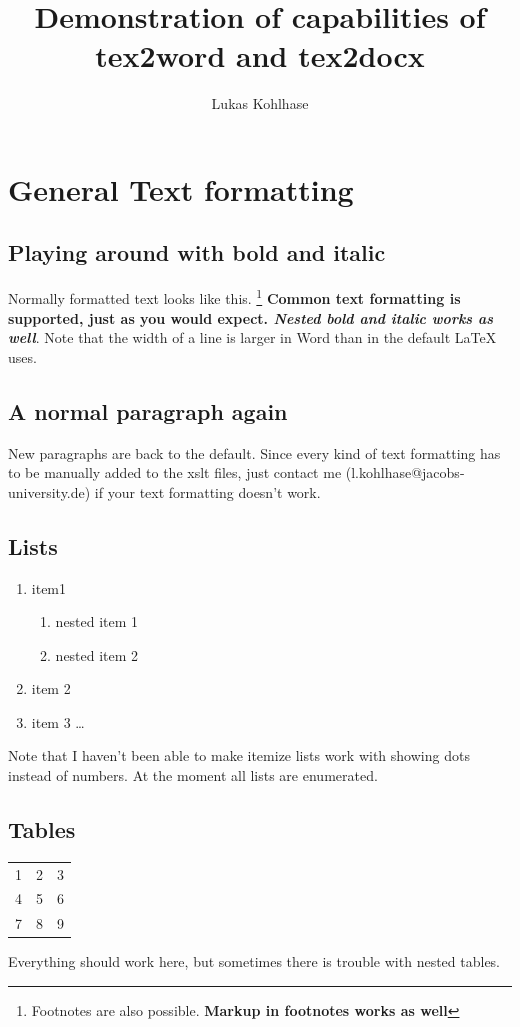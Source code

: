 \documentclass{article}
\author{Lukas Kohlhase}
\title{Demonstration of capabilities of tex2word and tex2docx}
\begin{document}
\maketitle
\section{General Text formatting}
\subsection{Playing around with bold and italic}
Normally formatted text looks like this. \footnote{Footnotes are also possible. \textbf{Markup in footnotes works as well}} \textbf{Common text formatting is supported, just as you would expect. \textit {Nested bold and italic works as well}}. Note that the width of a line is larger in Word than in the default LaTeX uses.  \\ 
\subsection{A normal paragraph again}
New paragraphs are back to the default. Since every kind of text formatting has to be manually added to the xslt files, just contact me (l.kohlhase@jacobs-university.de) if your text formatting doesn't work. 
\subsection{Lists}
\begin{enumerate}
\item item1
\begin{enumerate}
\item nested item 1
\item nested item 2
\end{enumerate}
\item item 2 
\item item 3 \ldots 
\end{enumerate}
Note that I haven't been able to make itemize lists work with showing dots instead of numbers. At the moment all lists are enumerated.
\subsection {Tables}
\begin{tabular}{ c c c }
  1 & 2 & 3 \\
  4 & 5 & 6 \\
  7 & 8 & 9 \\
\end{tabular}
Everything should work here, but sometimes there is trouble with nested tables. 
\end{document}
